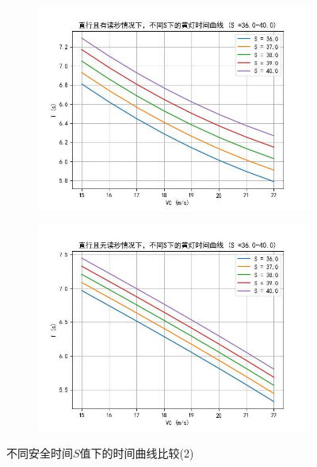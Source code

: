 \documentclass[withoutpreface,bwprint]{cumcmthesis}
\begin{document}
\begin{enumerate}
\begin{figure}[htbp]
		\bigskip %
		\begin{subfigure}[t]{0.45\textwidth}
			\centering
			\includegraphics[width=\textwidth]{pics/Time_Curve_S_WCT_STR40.00}
			\label{fig:S40_WCT}
		\end{subfigure}
		\hfill %
		\begin{subfigure}[t]{0.45\textwidth}
			\centering
			\includegraphics[width=\textwidth]{pics/Time_Curve_S_WOCT_STR40.00}
			\label{fig:S40_WOCT}
		\end{subfigure}
		\caption{不同安全时间\( S \)值下的时间曲线比较(2)}
		\label{fig:T2}
	\end{figure}
	

\end{enumerate}
\end{document}

